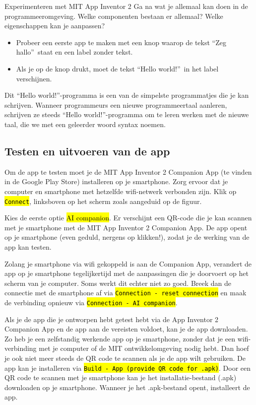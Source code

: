 \begin{opdracht}{Experimenteren met MIT App Inventor 2}
Ga na wat je allemaal kan doen in de programmeeromgeving. Welke componenten bestaan er allemaal? Welke eigenschappen kan je aanpassen?

\begin{itemize}
	\item Probeer een eerste app te maken met een knop waarop de tekst \textquotedblleft Zeg hallo\textquotedblright \ staat en een label zonder tekst. 
	\item Als je op de knop drukt, moet de tekst \textquotedblleft Hello world!\textquotedblright \ in het label verschijnen. 
\end{itemize}

Dit \textquotedblleft Hello world!\textquotedblright-programma is een van de simpelste programmatjes die je kan schrijven. Wanneer programmeurs een nieuwe programmeertaal aanleren, schrijven ze steeds \textquotedblleft Hello world!\textquotedblright-programma om te leren werken met de nieuwe taal, die we met een geleerder woord syntax noemen.
\end{opdracht}

\subsection{Testen en uitvoeren van de app}
Om de app te testen moet je de MIT App Inventor 2 Companion App (te vinden in de Google Play Store) installeren op je smartphone. 
Zorg ervoor dat je computer en smartphone met hetzelfde wifi-netwerk verbonden zijn. 
Klik op \hl{\texttt{Connect}}, linksboven op het scherm zoals aangeduid op de figuur.


Kies de eerste optie \hl{AI companion}. Er verschijnt een QR-code die je kan scannen met je smartphone met de MIT App Inventor 2 Companion App. De app opent op je smartphone (even geduld, nergens op klikken!), zodat je de werking van de app kan testen.

Zolang je smartphone  via wifi gekoppeld is aan de Companion App, verandert de app op je smartphone tegelijkertijd met de aanpassingen die je doorvoert op het scherm van je computer. Soms werkt dit echter niet zo goed. Breek dan de connectie met de smartphone af via \hl{\texttt{Connection - reset connection}} en maak de verbinding opnieuw via \hl{\texttt{Connection - AI companion}}.

Als je de app die je ontworpen hebt getest hebt via de App Inventor 2 Companion App en de app aan de vereisten voldoet, kan je de app downloaden. Zo heb je een zelfstandig werkende app op je smartphone, zonder dat je een wifi-verbinding met je computer of de MIT ontwikkelomgeving nodig hebt. Dan hoef je ook niet meer steeds de QR code te scannen als je de app wilt gebruiken. De app kan je installeren via \hl{\texttt{Build - App (provide QR code for .apk)}}. Door een QR code te scannen met je smartphone kan je het installatie-bestand (.apk) downloaden op je smartphone. Wanneer je het .apk-bestand opent, installeert de app.

